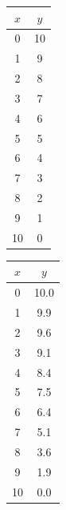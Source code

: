 \noindent
\begin{minipage}[t]{0.48\columnwidth}
\centering
\begin{tabular}{c|c}
$x$ & $y$ \\
\hline
0 & 10 \\
1 & 9 \\
2 & 8 \\
3 & 7 \\
4 & 6 \\
5 & 5 \\
6 & 4 \\
7 & 3 \\
8 & 2 \\
9 & 1 \\
10 & 0 \\
\end{tabular}
\end{minipage}
\hfill
\begin{minipage}[t]{0.48\columnwidth}
\centering
\begin{tabular}{c|c}
$x$ & $y$ \\
\hline
0 & 10.0 \\
1 & 9.9 \\
2 & 9.6 \\
3 & 9.1 \\
4 & 8.4 \\
5 & 7.5 \\
6 & 6.4 \\
7 & 5.1 \\
8 & 3.6 \\
9 & 1.9 \\
10 & 0.0 \\
\end{tabular}
\end{minipage}

\medskip


